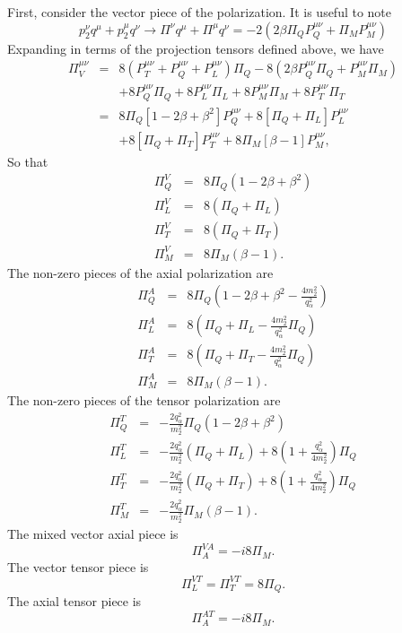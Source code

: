 \documentclass[12pt,letter]{article}
\begin{document}
First, consider the vector piece of the polarization. It is useful to note 
\begin{equation}
p_2^\nu q^\mu + p_2^\mu q^\nu \rightarrow 
\Pi^\nu q^\mu + \Pi^\mu q^\nu = 
- 2 \left(2 \beta \Pi_Q P_Q^{\mu \nu} + \Pi_M P_M^{\mu \nu} \right)
\end{equation}
Expanding in terms of the projection tensors defined above, we have
\begin{eqnarray}
\Pi^{\mu\nu}_V &=& 
8 \left(P_T^{\mu\nu} + P_Q^{\mu\nu} + P_L^{\mu\nu} \right) \Pi_Q
- 8 (2 \beta P^{\mu \nu}_Q \Pi_Q + P^{\mu \nu}_M \Pi_M) 
\nonumber\\ && 
+ 8 P^{\mu \nu}_Q \Pi_Q 
+ 8 P^{\mu \nu}_L \Pi_L
+ 8 P^{\mu \nu}_M \Pi_M
+ 8 P^{\mu \nu}_T \Pi_T  \\
&=& 8 \Pi_Q  \left[1  - 2\beta + \beta^2 \right]  P^{\mu \nu}_Q
  + 8 \left[\Pi_Q + \Pi_L \right] P_L^{\mu \nu} \\
&&  + 8 \left[\Pi_Q + \Pi_T \right] P_T^{\mu \nu} 
  + 8 \Pi_M \left[\beta - 1 \right] P_M^{\mu \nu}, 
\end{eqnarray}
So that 
\begin{eqnarray}
\Pi_Q^{V} &=& 8\Pi_Q(1 - 2 \beta + \beta^2) \\ 
\Pi_L^{V} &=& 8(\Pi_Q + \Pi_L) \\
\Pi_T^{V} &=& 8(\Pi_Q + \Pi_T) \\
\Pi_M^{V} &=& 8\Pi_M(\beta-1).
\end{eqnarray}
The non-zero pieces of the axial polarization are 
\begin{eqnarray}
\Pi_Q^{A} &=& 8\Pi_Q 
(1 - 2 \beta + \beta^2 - \frac{4 m_2^2}{q_\alpha^2}) \\ 
\Pi_L^{A} &=& 8( \Pi_Q + \Pi_L - \frac{4 m_2^2}{q_\alpha^2}\Pi_Q) \\
\Pi_T^{A} &=& 8(\Pi_Q + \Pi_T - \frac{4 m_2^2}{q_\alpha^2}\Pi_Q) \\
\Pi_M^{A} &=& 8\Pi_M(\beta-1).
\end{eqnarray}
The non-zero pieces of the tensor polarization are
\begin{eqnarray}
\Pi_Q^{T} &=& -\frac{2 q_\alpha^2}{m_2^2} \Pi_Q(1 - 2 \beta + \beta^2) \\ 
\Pi_L^{T} &=& -\frac{2 q_\alpha^2}{m_2^2} (\Pi_Q + \Pi_L) 
+ 8 \left(1+\frac{q_\alpha^2}{4 m_2^2}\right) \Pi_Q \\
\Pi_T^{T} &=& -\frac{2 q_\alpha^2}{m_2^2} (\Pi_Q + \Pi_T) 
 + 8 \left(1+\frac{q_\alpha^2}{4 m_2^2}\right) \Pi_Q \\
\Pi_M^{T} &=& -\frac{2 q_\alpha^2}{m_2^2} \Pi_M(\beta-1).
\end{eqnarray}
The mixed vector axial piece is 
\begin{equation}
\Pi^{VA}_A = - i 8 \Pi_M. 
\end{equation}
The vector tensor piece is 
\begin{equation} 
\Pi_L^{VT} = \Pi_T^{VT} = 8 \Pi_Q. 
\end{equation}
The axial tensor piece is
\begin{equation}
\Pi^{AT}_A = - i 8 \Pi_M. 
\end{equation}
\end{document}
